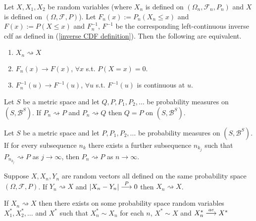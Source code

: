 \begin{theorem}[{\bf Portmanteau II}]
Let $X, X_1, X_2$ be random variables (where $X_n$ is defined on $(\Omega_n, \mathcal F_n, P_n)$ and $X$ is defined on $(\Omega, \mathcal F, P)$). Let $F_n(x):= P_n(X_n\leq x)$ and $F(x):= P(X\leq x)$  and $F_n^{-1}$, $F^{-1}$ be the corresponding left-continuous inverse cdf as defined in (\ref{inverse CDF definition}). Then the following are equivalent.
\begin{enumerate}
\item $X_n\rightsquigarrow X$
\item $F_n(x)\rightarrow F(x)$, $\forall x$ s.t.\! $P(X=x)=0$.
\item $F^{-1}_n(u)\rightarrow F^{-1}(u)$, $\forall u$ s.t.\! $F^{-1}(u)$ is continuous at $u$.
\end{enumerate}
\end{theorem}



\begin{theorem}
Let $S$ be a metric space and let $Q, P, P_1, P_2, \ldots$ be probability measures on $(S, \mathcal B^S)$.
If $P_n\rightsquigarrow P$ and $P_n \rightsquigarrow Q$ then $Q=P$ on $(S, \mathcal B^S)$.
\end{theorem}



\begin{theorem}
Let $S$ be a metric space and let $ P, P_1, P_2, \ldots$ be probability measures on $(S, \mathcal B^S)$. If for every subsequence $n_k$ there exists a further subsequence $n_{k_j}$ such that $P_{n_{k_j}} \rightsquigarrow P$ as $j\rightarrow \infty$, then $P_n \rightsquigarrow P$ as $n\rightarrow \infty$. 
\end{theorem}


\begin{theorem} Suppose $X, X_n, Y_n$ are random vectors all defined on the same probability space $(\Omega, \mathcal F, P)$. If $Y_n \rightsquigarrow X$ and $|X_n- Y_n|\overset{\small P} \longrightarrow 0$ then $X_n \rightsquigarrow X$.  
\end{theorem}




\begin{theorem}
\label{Skorkhod 1}
If $X_n \rightsquigarrow X$ then there exists on some probability space random variables $X_1^*, X_2^*, \ldots$ and $X^*$ such that $X^*_n\sim X_n$ for each $n$, $X^*\sim X$ and $X_n^*\overset{\small ae} \longrightarrow X^*$
\end{theorem}

